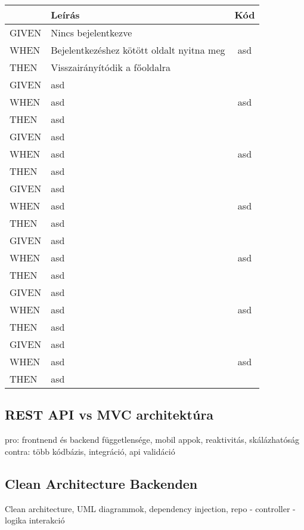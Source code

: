 \begin{table}[H]
	\centering
	\begin{tabular}{|l|l|c|}
		\hline
		& \textbf{Leírás} & \textbf{Kód} \\
		\hline
		GIVEN & Nincs bejelentkezve & \multirow{3}{*}{asd} \\ \cline{1-2}
		WHEN & Bejelentkezéshez kötött oldalt nyitna meg & \\ \cline{1-2}
		THEN & Visszairányítódik a főoldalra & \\ 
		\hline
		GIVEN & asd & \multirow{3}{*}{asd} \\ \cline{1-2}
		WHEN & asd & \\ \cline{1-2}
		THEN & asd & \\ 
		\hline
		GIVEN & asd & \multirow{3}{*}{asd} \\ \cline{1-2}
		WHEN & asd & \\ \cline{1-2}
		THEN & asd & \\ 
		\hline
		GIVEN & asd & \multirow{3}{*}{asd} \\ \cline{1-2}
		WHEN & asd & \\ \cline{1-2}
		THEN & asd & \\ 
		\hline
		GIVEN & asd & \multirow{3}{*}{asd} \\ \cline{1-2}
		WHEN & asd & \\ \cline{1-2}
		THEN & asd & \\ 
		\hline
		GIVEN & asd & \multirow{3}{*}{asd} \\ \cline{1-2}
		WHEN & asd & \\ \cline{1-2}
		THEN & asd & \\ 
		\hline
		GIVEN & asd & \multirow{3}{*}{asd} \\ \cline{1-2}
		WHEN & asd & \\ \cline{1-2}
		THEN & asd & \\ 
		\hline
	\end{tabular}
\end{table}

\subsection{REST API vs MVC architektúra}
pro: frontnend és backend függetlensége, mobil appok, reaktivitás, skálázhatóság
contra: több kódbázis, integráció, api validáció

\subsection{Clean Architecture Backenden}
Clean architecture, UML diagrammok, dependency injection,
repo - controller - logika interakció

